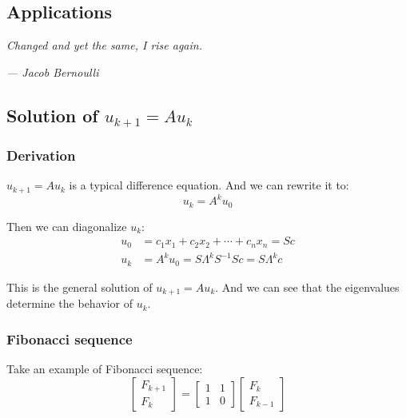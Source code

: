 \documentclass[12pt]{ctexart}
\begin{document}
\newpage
\thispagestyle{empty}
\begin{center}
    \vspace*{96pt}
    \fontsize{60}{60}\par
    \fontsize{26}{31.2}\section{\textbf{Applications}}\par %
    \vspace{25pt}
    \begin{center}
      \fontsize{18}{21.6}\customfont\textit{Changed and yet the same, I rise again.}
    \end{center}
    \begin{flushright}
      \fontsize{18}{21.6}\customfont\textit{--- Jacob Bernoulli}
    \end{flushright}
    \vfill
\end{center}

\newpage
\subsection{\textbf{Solution of $u_{k+1} = Au_k$}}
\subsubsection{\textbf{Derivation}}

$u_{k+1} = Au_k$ is a typical difference equation. And we can rewrite it to:
\[
  u_k = A^k u_0
\]

Then we can diagonalize $u_k$:
\begin{align*}
  u_0 &= c_1 x_1 + c_2 x_2 + \cdots + c_n x_n = Sc \\
  u_k &= A^k u_0 = S\Lambda^k S^{-1}Sc = S\Lambda^k c
\end{align*}

This is the general solution of $u_{k+1} = Au_k$. And we can see that the eigenvalues
determine the behavior of $u_k$.

\subsubsection{\textbf{Fibonacci sequence}}

Take an example of Fibonacci sequence:
\[
  \begin{bmatrix}
    F_{k+1} \\
    F_k
  \end{bmatrix} =
  \begin{bmatrix}
    1 & 1 \\
    1 & 0
  \end{bmatrix}
  \begin{bmatrix}
    F_k \\
    F_{k-1}
  \end{bmatrix}
\]
\end{document}
